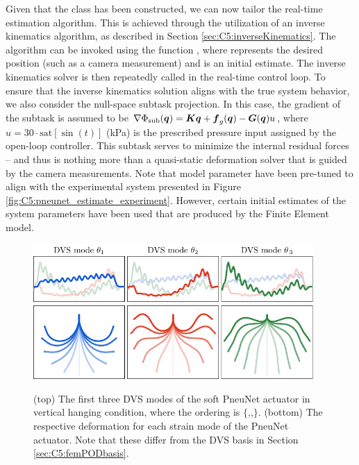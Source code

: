 Given that the  class has been constructed, we can now tailor the real-time estimation algorithm. This is achieved through the utilization of an inverse kinematics algorithm, as described in Section \ref{sec:C5:inverseKinematics}. The algorithm can be invoked using the function , where  represents the desired position (such as a camera measurement) and  is an initial estimate. The inverse kinematics solver is then repeatedly called in the real-time control loop. To ensure that the inverse kinematics solution aligns with the true system behavior, we also consider the null-space subtask projection. In this case, the gradient of the subtask is assumed to be $\nabla \Phi_{\textrm{sub}}({\boldsymbol{q}}) = {\boldsymbol{K}} {\boldsymbol{q}} + {\boldsymbol{f}}_g({\boldsymbol{q}}) - {\boldsymbol{G}}({\boldsymbol{q}}) u$, where $u = 30 \cdot \textrm{sat}\left[ \sin(t) \right]$ (\si{\kilo \pascal}) is the prescribed pressure input assigned by the open-loop controller. This subtask serves to minimize the internal residual forces -- and thus is nothing more than a quasi-static deformation solver that is guided by the camera measurements. Note that model parameter have been pre-tuned to align with the experimental system presented in Figure \ref{fig:C5:pneunet_estimate_experiment}. However, certain initial estimates of the system parameters have been used that are produced by the Finite Element model.

\begin{figure}[!t]
    \centering
    \includegraphics*[width=0.95\textwidth]{./pdf/thesis-figure-6-32-1.pdf} \\[0.25em]
    \includegraphics*[width=0.95\textwidth]{./pdf/thesis-figure-6-32-2.pdf}
    \caption{(top) The first three DVS modes of the soft PneuNet actuator in vertical hanging condition, where the ordering is $\{$,,$\}$. (bottom) The respective deformation for each strain mode of the PneuNet actuator. Note that these differ from the DVS basis in Section \ref{sec:C5:femPODbasis}.}
    \label{fig:C5:pneunet_modes_fem}
    \vspace{-3mm}
\end{figure}


